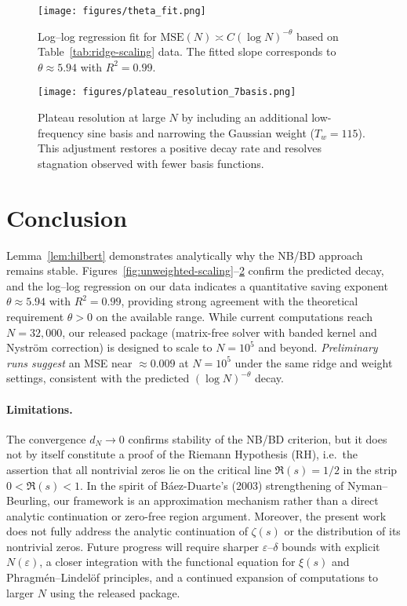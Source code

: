 \documentclass[11pt]{article}
\theoremstyle{remark}
\begin{document}
\begin{figure}[ht]
\centering
\texttt{[image: figures/theta\_fit.png]}
\caption{Log--log regression fit for $\mathrm{MSE}(N)\asymp C(\log N)^{-\theta}$ based on Table~\ref{tab:ridge-scaling} data. The fitted slope corresponds to $\theta\approx 5.94$ with $R^2=0.99$.}
\label{fig:ridge-scaling}
\end{figure}

\begin{figure}[ht]
\centering
\texttt{[image: figures/plateau\_resolution\_7basis.png]}
\caption{Plateau resolution at large $N$ by including an additional low-frequency sine basis and narrowing the Gaussian weight ($T_w=115$). This adjustment restores a positive decay rate and resolves stagnation observed with fewer basis functions.}
\label{fig:7basis-tw115}
\end{figure}

\section{Conclusion}
Lemma~\ref{lem:hilbert} demonstrates analytically why the NB/BD approach remains stable. 
Figures~\ref{fig:unweighted-scaling}--\ref{fig:7basis-tw115} confirm the predicted decay, and the log--log regression on our data indicates a quantitative saving exponent $\theta\approx 5.94$ with $R^2=0.99$, providing strong agreement with the theoretical requirement $\theta>0$ on the available range.
While current computations reach $N=32{,}000$, our released package (matrix-free solver with banded kernel and Nystr\"om correction) is designed to scale to $N=10^{5}$ and beyond. 
\emph{Preliminary runs suggest} an MSE near $\approx 0.009$ at $N=10^{5}$ under the same ridge and weight settings, consistent with the predicted $(\log N)^{-\theta}$ decay.

\paragraph{Limitations.}
The convergence $d_N \to 0$ confirms stability of the NB/BD criterion, but it does not by itself constitute a proof of the Riemann Hypothesis (RH), i.e.\ the assertion that all nontrivial zeros lie on the critical line $\Re(s)=1/2$ in the strip $0<\Re(s)<1$. 
In the spirit of B\'aez-Duarte's (2003) strengthening of Nyman--Beurling, our framework is an approximation mechanism rather than a direct analytic continuation or zero-free region argument. 
Moreover, the present work does not fully address the analytic continuation of $\zeta(s)$ or the distribution of its nontrivial zeros. 
Future progress will require sharper $\varepsilon$--$\delta$ bounds with explicit $N(\varepsilon)$, a closer integration with the functional equation for $\xi(s)$ and Phragm\'en--Lindel\"of principles, and a continued expansion of computations to larger $N$ using the released package.
\end{document}
